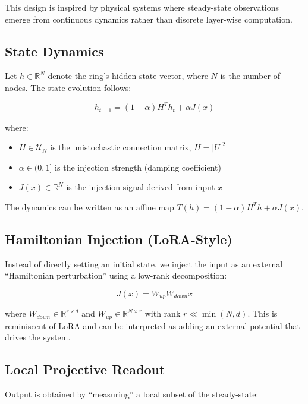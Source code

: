 \documentclass[11pt,a4paper]{article}
\newcommand{\R}{\mathbb{R}}
\newcommand{\U}{\mathcal{U}}
\begin{document}
This design is inspired by physical systems where steady-state observations emerge from continuous dynamics rather than discrete layer-wise computation.

\subsection{State Dynamics}

Let $h \in \R^N$ denote the ring's hidden state vector, where $N$ is the number of nodes. The state evolution follows:

\begin{equation}
\label{eq:dynamics}
h_{t+1} = (1 - \alpha) H^T h_t + \alpha J(x)
\end{equation}

where:
\begin{itemize}
    \item $H \in \U_N$ is the unistochastic connection matrix, $H = |U|^2$
    \item $\alpha \in (0, 1]$ is the injection strength (damping coefficient)
    \item $J(x) \in \R^N$ is the injection signal derived from input $x$
\end{itemize}

The dynamics can be written as an affine map $T(h) = (1-\alpha)H^Th + \alpha J(x)$.

\subsection{Hamiltonian Injection (LoRA-Style)}

Instead of directly setting an initial state, we inject the input as an external ``Hamiltonian perturbation'' using a low-rank decomposition:

\begin{equation}
\label{eq:injection}
J(x) = W_{up} W_{down} x
\end{equation}

where $W_{down} \in \R^{r \times d}$ and $W_{up} \in \R^{N \times r}$ with rank $r \ll \min(N, d)$. This is reminiscent of LoRA \citep{hu2021lora} and can be interpreted as adding an external potential that drives the system.

\subsection{Local Projective Readout}

Output is obtained by ``measuring'' a local subset of the steady-state:
\end{document}
